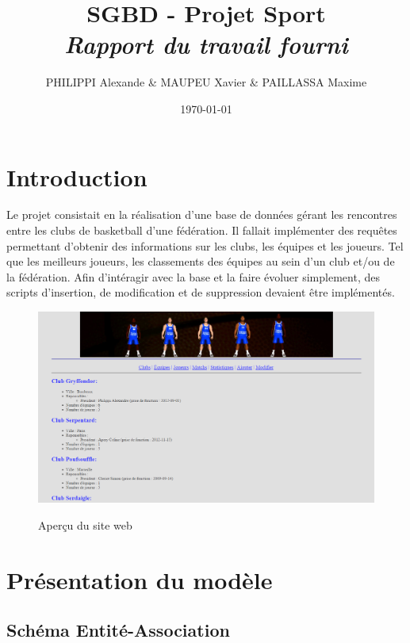 \documentclass[a4paper»,8pt,french,fleqn]{report}
\title{\textbf{SGBD - Projet Sport }\\\textit{Rapport du travail fourni}}
\author{PHILIPPI Alexande \& MAUPEU Xavier \& PAILLASSA Maxime}
\date{\today}
\begin{document}
\maketitle

\newpage

\tableofcontents

\newpage

\chapter*{Introduction}

Le projet consistait en la réalisation d'une base de données gérant les rencontres entre les clubs de basketball d'une fédération. Il fallait implémenter des requêtes permettant d'obtenir des informations sur les clubs, les équipes et les joueurs. Tel que les meilleurs joueurs, les classements des équipes au sein d'un club et/ou de la fédération. Afin d'intéragir avec la base et la faire évoluer simplement, des scripts d'insertion, de modification et de suppression devaient être implémentés.

\begin{figure}[h]
  \centering
    \includegraphics[scale=0.45]{site.png}
    \label{fig:website}
    \caption{Aperçu du site web}
\end{figure}

\chapter{Présentation du modèle}

\section{Schéma Entité-Association}
\end{document}
